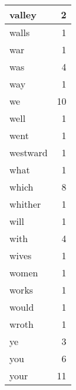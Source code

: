 \begin{center}
\begin{longtable}{l|r}
valley & 2 \\ \hline
walls & 1 \\ \hline
war & 1 \\ \hline
was & 4 \\ \hline
way & 1 \\ \hline
we & 10 \\ \hline
well & 1 \\ \hline
went & 1 \\ \hline
westward & 1 \\ \hline
what & 1 \\ \hline
which & 8 \\ \hline
whither & 1 \\ \hline
will & 1 \\ \hline
with & 4 \\ \hline
wives & 1 \\ \hline
women & 1 \\ \hline
works & 1 \\ \hline
would & 1 \\ \hline
wroth & 1 \\ \hline
ye & 3 \\ \hline
you & 6 \\ \hline
your & 11 \\ \hline
\end{longtable}
\end{center}



\normalsize



